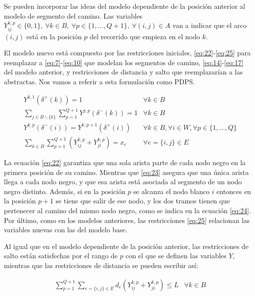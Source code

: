 \documentclass[10pt, a4paper]{article}
\theoremstyle{definition}
\begin{document}
Se pueden incorporar las ideas del modelo dependiente de la posición anterior al modelo de segmento del camino. Las variables $Y_{i j}^{k, p} \in\{0,1\},\ \forall k \in B,\ \forall p \in\{1, \ldots, Q+1\},\ \forall(i, j) \in A$ van a indicar que el arco $(i,j)$ está en la posición $p$ del recorrido que empieza en el nodo $k$.

El modelo nuevo está compuesto por las restricciones iniciales, \ref{eq:22}-\ref{eq:25} para reemplazar a \ref{eq:7}-\ref{eq:10} que modelan los segmentos de camino, \ref{eq:14}-\ref{eq:17} del modelo anterior, y restricciones de distancia y salto que reemplazarían a las abstractas. Nos vamos a referir a esta formulación como PDPS.

\begin{align}
	& Y^{k, 1}\left(\delta^{+}(k)\right)=1 & \forall k \in B \label{eq:22} \\
	& \sum_{j \in B \backslash\{k\}} \sum_{p=1}^{Q+1} Y^{j, p}\left(\delta^{-}(k)\right)=1 & \forall k \in B \label{eq:23} \\
	& Y^{k, p}\left(\delta^{-}(i)\right)=Y^{k, p+1}\left(\delta^{+}(i)\right) & \forall k \in B, \forall i \in W, \forall p \in\{1, \ldots, Q\} \label{eq:24} \\
	& \sum_{k \in B} \sum_{p=1}^{Q+1}\left(Y_{i j}^{k, p}+Y_{j i}^{k, p}\right)=x_{e} & \forall e=\{i, j\} \in E \label{eq:25}
\end{align}

La ecuación \ref{eq:22} garantiza que una sola arista parte de cada nodo negro en la primera posición de su camino. Mientras que \ref{eq:23} asegura que una única arista llega a cada nodo negro, y que esa arista está asociada al segmento de un nodo negro distinto. Además, si en la posición $p$ se alcanza el nodo blanco $i$ entonces en la posición $p+1$ se tiene que salir de ese nodo, y los dos tramos tienen que pertenecer al camino del mismo nodo negro, como se indica en la ecuación \ref{eq:24}. Por último, como en los modelos anteriores, las restricciones \ref{eq:25} relacionan las variables nuevas con las del modelo base.

Al igual que en el modelo dependiente de la posición anterior, las restricciones de salto están satisfechas por el rango de $p$ con el que se definen las variables $Y$, mientras que las restricciones de distancia se pueden escribir así:

\begin{align}
	& \sum_{p=1}^{Q+1} \sum_{e=\{i, j\} \in E} d_{e}\left(Y_{i j}^{k, p}+Y_{j i}^{k, p}\right) \leq L & \forall k \in B \label{eq:26}
\end{align}
\end{document}

